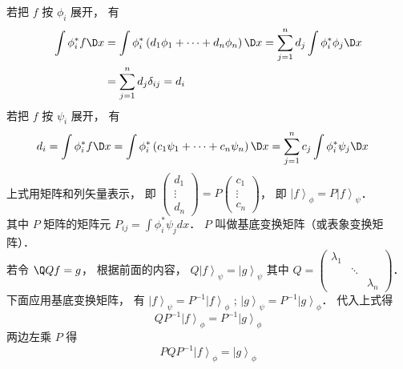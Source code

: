 若把 $f$ 按 ${\phi_i}$ 展开， 有
\begin{equation}
\begin{aligned}
\int {\phi_i^*f   \D x} & = \int {\phi_i^*\left( {{d_1}{\phi_1} + \dots + {d_n}{\phi_n}} \right)   \D x}  = \sum\limits_{j = 1}^n {d_j} \int {\phi_i^*{\phi_j} \D x}  \\
&= \sum\limits_{j = 1}^n {d_j} {\delta_{ij}} = {d_i}
\end{aligned}
\end{equation}
若把 $f$ 按 $\psi_i$ 展开， 有
\begin{equation}
\begin{aligned}
{d_i} & = \int {\phi_i^*f   \D x}   = \int {\phi_i^*\left( {{c_1}{\psi_1} + \dots + {c_n}{\psi_n}} \right)   \D x} = \sum\limits_{j = 1}^n {c_j} \int {\phi_i^*{\psi_j} \D x}
\end{aligned}
\end{equation}
上式用矩阵和列矢量表示， 即 $\left( {\begin{aligned}
{{d_1}}\\
 \vdots \\
{{d_n}}
\end{aligned}} \right) = P\left( {\begin{aligned}
{{c_1}}\\
 \vdots \\
{{c_n}}
\end{aligned}} \right)$，  即 ${\left| f \right\rangle_\phi } = P{\left| f \right\rangle_\psi }$．\\
其中 $P$ 矩阵的矩阵元 ${P_{ij}} = \int {\phi_i^*{\psi_j}dx} $．  $P$ 叫做基底变换矩阵（或表象变换矩阵）．\\
若令 $\Q Q f = g$，  根据前面的内容， $Q{\left| f \right\rangle_\psi } = {\left| g \right\rangle_\psi }$ 其中 $Q = \left( {\begin{aligned}
{{\lambda_1}}&{}&{}\\
{}& \ddots &{}\\
{}&{}&{{\lambda_n}}
\end{aligned}} \right)$． \\
下面应用基底变换矩阵， 有 ${\left| f \right\rangle_\psi } = {P^{ - 1}}{\left| f \right\rangle_\phi }$ ; ${\left| g \right\rangle_\psi } = {P^{ - 1}}{\left| g \right\rangle_\phi }$． 代入上式得
\begin{equation}
  Q{P^{ - 1}}{\left| f \right\rangle_\phi } = {P^{ - 1}}{\left| g \right\rangle_\phi }
\end{equation}
两边左乘 $P$ 得
\begin{equation}
  PQ{P^{ - 1}}{\left| f \right\rangle_\phi } = {\left| g \right\rangle_\phi }
\end{equation}
